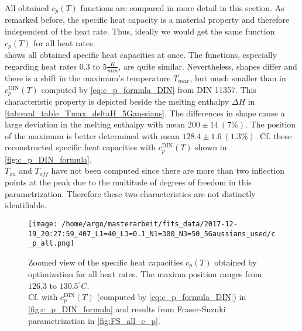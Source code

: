 \documentclass{scrartcl}[12pt, halfparskip]
\numberwithin{equation}{section}
\numberwithin{figure}{section}
\numberwithin{table}{section}
\begin{document}
All obtained $c_p(T)$ functions are compared in more detail in this section. As remarked before, the specific heat capacity is a material property and therefore independent of the heat rate. Thus, ideally we would get the same function $c_p(T)$ for all heat rates. \\
 shows all obtained specific heat capacities at once. 
The functions, especially regarding heat rates $0.3$ to $5 \frac{K}{min}$, are quite similar. 
Nevertheless, shapes differ and there is a shift in the maximum's temperature $T_{max}$, but much smaller than in $c_p^{\text{DIN}}(T)$ computed by \cref{eq:c_p_formula_DIN} from DIN 11357. This characteristic property is depicted beside the melting enthalpy $\Delta H$ in \cref{tab:eval_table_Tmax_deltaH_5Gaussians}. The differences in shape cause a large deviation in the melting enthalpy with mean $200 \pm 14 \ (7\%)$. The position of the maximum is better determined with mean $128.4 \pm 1.6 \ (1.3\%)$. Cf. these reconstructed specific heat capacities with $c_p^{\text{DIN}}(T)$ shown in \cref{fig:c_p_DIN_formula}. \\
$T_{on}$ and $T_{off}$ have not been computed since there are more than two inflection points at the peak due to the multitude of degrees of freedom in this parametrization. Therefore these two characteristics are not distinctly identifiable.



\begin{figure}[H]
	\centering
	\texttt{[image: /home/argo/masterarbeit/fits\_data/2017-12-19\_20:27:59\_407\_L1=40\_L3=0.1\_N1=300\_N3=50\_5Gaussians\_used/c\_p\_all.png]}
	\caption{Zoomed view of the specific heat capacities $c_p(T)$ obtained by optimization for all heat rates. The maxima position ranges from $126.3$ to $130.5^{\circ}C$. \\
	Cf. with $c_p^{\text{DIN}}(T)$ (computed by \cref{eq:c_p_formula_DIN}) in \cref{fig:c_p_DIN_formula} and results from Fraser-Suzuki parametrization in \cref{fig:FS_all_c_p}.}
	\label{fig:5Gaussians_all_c_p}
\end{figure}
\end{document}
